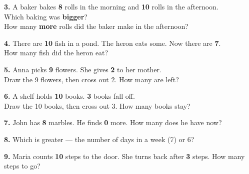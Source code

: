 \documentclass[12pt, letterpaper]{article}
\newcommand{\answerline}{\underline{\hspace{2.5cm}}}
\begin{document}
\bigskip

\begin{storybox}
\textbf{3.} A baker bakes \textbf{8} rolls in the morning and \textbf{10} rolls in the afternoon.\\
Which baking was \textbf{bigger}? \hfill \answerline\\[4pt]
How many \textbf{more} rolls did the baker make in the afternoon? \hfill \answerline
\end{storybox}

\bigskip

\begin{storybox}
\textbf{4.} There are \textbf{10} fish in a pond. The heron eats some. Now there are \textbf{7}.\\
How many fish did the heron eat? \hfill \answerline
\end{storybox}

\bigskip

\begin{storybox}
\textbf{5.} Anna picks \textbf{9} flowers. She gives \textbf{2} to her mother.\\
Draw the 9 flowers, then cross out 2. How many are left? \hfill \answerline\\[18pt]
\end{storybox}

\bigskip

\begin{storybox}
\textbf{6.} A shelf holds \textbf{10} books. \textbf{3} books fall off.\\
Draw the 10 books, then cross out 3. How many books stay? \hfill \answerline\\[18pt]
\end{storybox}

\bigskip

\noindent\textbf{7.} John has \textbf{8} marbles. He finds \textbf{0} more. How many does he have now? \hfill \answerline

\bigskip
\noindent\textbf{8.} Which is greater — the number of days in a week (7) or 6? \hfill \answerline

\bigskip
\noindent\textbf{9.} Maria counts \textbf{10} steps to the door. She turns back after \textbf{3} steps. How many steps to go? \hfill \answerline
\end{document}
